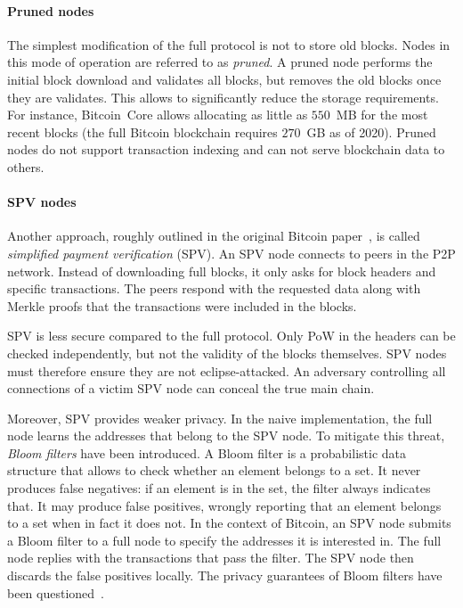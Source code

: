 \paragraph{Pruned nodes}
The simplest modification of the full protocol is not to store old blocks.
Nodes in this mode of operation are referred to as \textit{pruned}.
A pruned node performs the initial block download and validates all blocks, but removes the old blocks once they are validates.
This allows to significantly reduce the storage requirements.
For instance, Bitcoin~Core allows allocating as little as $550$~MB for the most recent blocks (the full Bitcoin blockchain requires $270$~GB as of 2020).
Pruned nodes do not support transaction indexing and can not serve blockchain data to others.

\paragraph{SPV nodes}
Another approach, roughly outlined in the original Bitcoin paper~\cite{Nakamoto2008}, is called \textit{simplified payment verification} (SPV).
An SPV node connects to peers in the P2P network.
Instead of downloading full blocks, it only asks for block headers and specific transactions.
The peers respond with the requested data along with Merkle proofs that the transactions were included in the blocks.

SPV is less secure compared to the full protocol.
Only PoW in the headers can be checked independently, but not the validity of the blocks themselves.
SPV nodes must therefore ensure they are not eclipse-attacked.
An adversary controlling all connections of a victim SPV node can conceal the true main chain.

Moreover, SPV provides weaker privacy.
In the naive implementation, the full node learns the addresses that belong to the SPV node.
To mitigate this threat, \textit{Bloom filters} have been introduced.
A Bloom filter is a probabilistic data structure that allows to check whether an element belongs to a set.
It never produces false negatives: if an element is in the set, the filter always indicates that.
It may produce false positives, wrongly reporting that an element belongs to a set when in fact it does not.
In the context of Bitcoin, an SPV node submits a Bloom filter to a full node to specify the addresses it is interested in.
The full node replies with the transactions that pass the filter.
The SPV node then discards the false positives locally.
The privacy guarantees of Bloom filters have been questioned~\cite{Gervais2014}.

